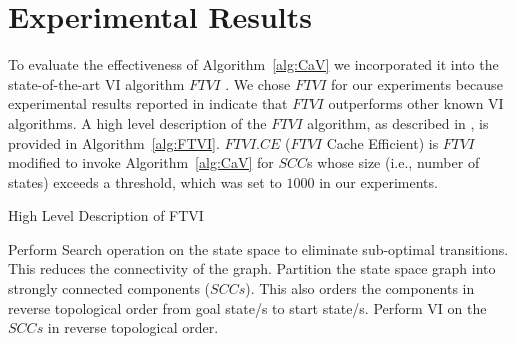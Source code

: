 \documentclass[conference]{IEEEtran}
\begin{document}
\section{Experimental Results}
\label{sec:exp}
To evaluate the effectiveness of Algorithm~\ref{alg:CaV} we incorporated it
into the state-of-the-art VI algorithm $FTVI$ \cite{b10}.
We chose $FTVI$ for our experiments because experimental results reported in \cite{b10} indicate that $FTVI$ outperforms other known VI algorithms.
A high level description of the $FTVI$ algorithm, as described in \cite{b10}, is provided in Algorithm~\ref{alg:FTVI}.
$FTVI.CE$ ($FTVI$ Cache Efficient) is $FTVI$ modified to invoke Algorithm~\ref{alg:CaV} for $SCC$s whose size (i.e., number of states) exceeds a threshold, which was set to $1000$ in our experiments.

\begin{algorithm}[h]
\caption{High Level Description of FTVI}
\label{alg:FTVI}
\begin{algorithmic}[1]
\State Perform Search operation on the state space to eliminate sub-optimal transitions. This reduces the connectivity of the graph.
\State Partition the state space graph into strongly connected components ($SCCs$). This also  orders the components in reverse topological order from goal state/s to start state/s.
\State Perform VI on the $SCCs$ in reverse topological order.
\end{algorithmic}
\end{algorithm}
\end{document}
